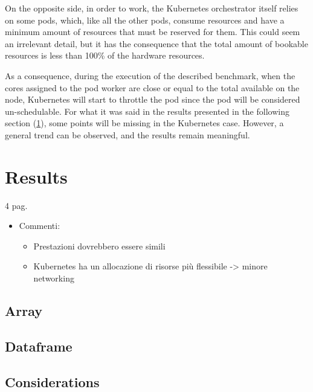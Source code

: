 On the opposite side, in order to work, the Kubernetes orchestrator itself
relies on some pods, which, like all the other pods, consume resources and have
a minimum amount of resources that must be reserved for them.
This could seem an irrelevant detail, but it has the consequence that the total
amount of bookable resources is less than 100\% of the hardware resources.

As a consequence, during the execution of the described benchmark, when the
cores assigned to the pod worker are close or equal to the total available on
the node, Kubernetes will start to throttle the pod since the pod will be
considered un-schedulable.
For what it was said in the results presented in the following section
(\ref{sec:daskresults}), some points will be missing in the Kubernetes case.
However, a general trend can be observed, and the results remain meaningful.

\section{Results}\label{sec:daskresults}


4 pag.

\begin{itemize}
  \item Commenti:
    \begin{itemize}
      \item Prestazioni dovrebbero essere simili
      \item Kubernetes ha un allocazione di risorse più flessibile -> minore networking
    \end{itemize}
\end{itemize}

\subsection{Array}

\subsection{Dataframe}

\subsection{Considerations}
